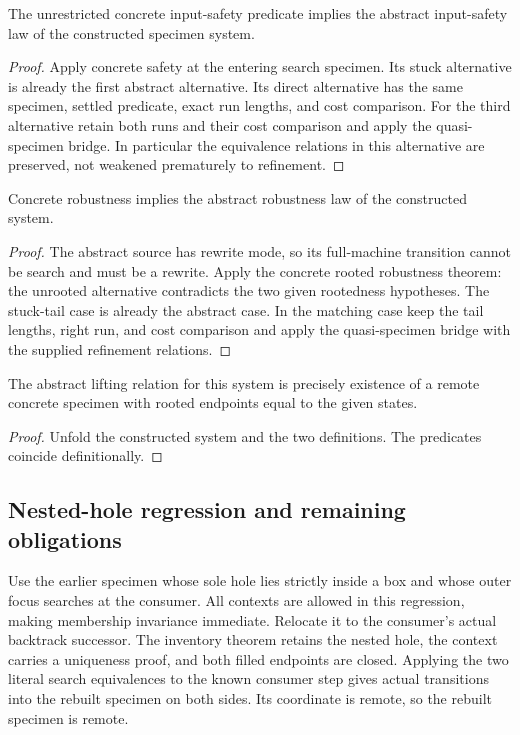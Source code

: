
\begin{theorem}
The unrestricted concrete input-safety predicate implies the abstract
input-safety law of the constructed specimen system.
\end{theorem}
\begin{proof}
Apply concrete safety at the entering search specimen. Its stuck alternative
is already the first abstract alternative. Its direct alternative has the
same specimen, settled predicate, exact run lengths, and cost comparison.
For the third alternative retain both runs and their cost comparison and
apply the quasi-specimen bridge. In particular the equivalence relations in
this alternative are preserved, not weakened prematurely to refinement.
\end{proof}


\begin{theorem}
Concrete robustness implies the abstract robustness law of the constructed
system.
\end{theorem}
\begin{proof}
The abstract source has rewrite mode, so its full-machine transition cannot
be search and must be a rewrite. Apply the concrete rooted robustness theorem:
the unrooted alternative contradicts the two given rootedness hypotheses.
The stuck-tail case is already the abstract case. In the matching case keep
the tail lengths, right run, and cost comparison and apply the quasi-specimen
bridge with the supplied refinement relations.
\end{proof}
\begin{lemma}
The abstract lifting relation for this system is precisely existence of a
remote concrete specimen with rooted endpoints equal to the given states.
\end{lemma}
\begin{proof}
Unfold the constructed system and the two definitions. The predicates coincide
definitionally.
\end{proof}



\subsection{Nested-hole regression and remaining obligations}
Use the earlier specimen whose sole hole lies strictly inside a box and whose
outer focus searches at the consumer. All contexts are allowed in this
regression, making membership invariance immediate. Relocate it to the
consumer's actual backtrack successor. The inventory theorem retains the
nested hole, the context carries a uniqueness proof, and both filled endpoints
are closed. Applying the two literal search equivalences to the known consumer
step gives actual transitions into the rebuilt specimen on both sides.
Its coordinate is remote, so the rebuilt specimen is remote.

